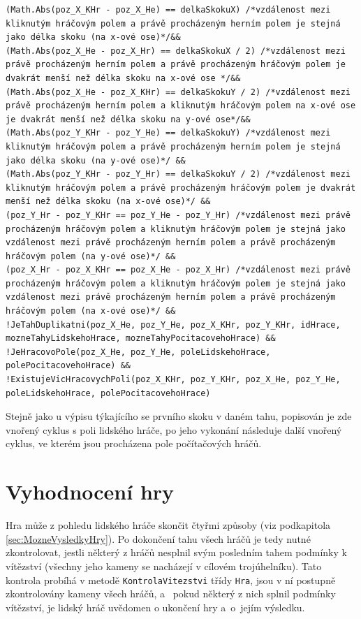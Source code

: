 \begin{lstlisting}[label=src:moznyTahSkokyDalsi,caption={Podmínky pro vytvoření možného tahu - skoky (druhý a další skok)}]
(Math.Abs(poz_X_KHr - poz_X_He) == delkaSkokuX) /*vzdálenost mezi kliknutým hráčovým polem a právě procházeným herním polem je stejná jako délka skoku (na x-ové ose)*/&&
(Math.Abs(poz_X_He - poz_X_Hr) == delkaSkokuX / 2) /*vzdálenost mezi právě procházeným herním polem a právě procházeným hráčovým polem je dvakrát menší než délka skoku na x-ové ose */&&
(Math.Abs(poz_X_He - poz_X_KHr) == delkaSkokuY / 2) /*vzdálenost mezi právě procházeným herním polem a kliknutým hráčovým polem na x-ové ose je dvakrát menší než délka skoku na y-ové ose*/&&
(Math.Abs(poz_Y_KHr - poz_Y_He) == delkaSkokuY) /*vzdálenost mezi kliknutým hráčovým polem a právě procházeným herním polem je stejná jako délka skoku (na y-ové ose)*/ &&
(Math.Abs(poz_Y_KHr - poz_Y_Hr) == delkaSkokuY / 2) /*vzdálenost mezi kliknutým hráčovým polem a právě procházeným hráčovým polem je dvakrát menší než délka skoku (na x-ové ose)*/ &&
(poz_Y_Hr - poz_Y_KHr == poz_Y_He - poz_Y_Hr) /*vzdálenost mezi právě procházeným hráčovým polem a kliknutým hráčovým polem je stejná jako vzdálenost mezi právě procházeným herním polem a právě procházeným hráčovým polem (na y-ové ose)*/ &&
(poz_X_Hr - poz_X_KHr == poz_X_He - poz_X_Hr) /*vzdálenost mezi právě procházeným hráčovým polem a kliknutým hráčovým polem je stejná jako vzdálenost mezi právě procházeným herním polem a právě procházeným hráčovým polem (na x-ové ose)*/ &&
!JeTahDuplikatni(poz_X_He, poz_Y_He, poz_X_KHr, poz_Y_KHr, idHrace, mozneTahyLidskehoHrace, mozneTahyPocitacovehoHrace) &&
!JeHracovoPole(poz_X_He, poz_Y_He, poleLidskehoHrace, polePocitacovehoHrace) &&
!ExistujeVicHracovychPoli(poz_X_KHr, poz_Y_KHr, poz_X_He, poz_Y_He, poleLidskehoHrace, polePocitacovehoHrace)
\end{lstlisting}

Stejně jako u výpisu týkajícího se prvního skoku v daném tahu, popisován je zde vnořený cyklus s poli lidského hráče, po jeho vykonání následuje další vnořený cyklus, ve kterém jsou procházena pole počítačových hráčů.

\section{Vyhodnocení hry} 
Hra může z pohledu lidského hráče skončit čtyřmi způsoby (viz podkapitola \ref{sec:MozneVysledkyHry}). Po dokončení tahu všech hráčů je tedy nutné zkontrolovat, jestli některý z hráčů nesplnil svým posledním tahem podmínky k vítězství (všechny jeho kameny se nacházejí v cílovém trojúhelníku). Tato kontrola probíhá v metodě \lstinline$KontrolaVitezstvi$ třídy \lstinline$Hra$, jsou v ní postupně zkontrolovány kameny všech hráčů, a~ pokud některý z nich splnil podmínky vítězství, je lidský hráč uvědomen o ukončení hry a~o~jejím výsledku.

